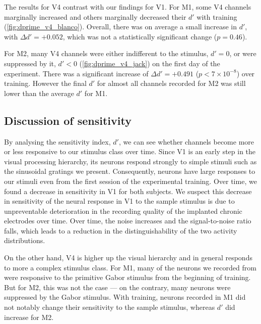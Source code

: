 The results for \ac{V4} contrast with our findings for \ac{V1}.
For \ac{M1}, some \ac{V4} channels marginally increased and others marginally decreased their $d'$ with training (\autoref{fig:dprime_v4_blanco}).
Overall, there was on average a small increase in $d'$, with $\Delta d' = +0.052$, which was not a statistically significant change ($p=0.46$).

For \ac{M2}, many \ac{V4} channels were either indifferent to the stimulus, $d'=0$, or were suppressed by it, $d'<0$ (\autoref{fig:dprime_v4_jack}) on the first day of the experiment.
There was a significant increase of $\Delta d' = +0.491$ ($p < 7 \times 10 ^{-8}$) over training.
However the final $d'$ for almost all channels recorded for \ac{M2} was still lower than the average $d'$ for \ac{M1}.


\subsection{Discussion of sensitivity}
\label{sec:pl_dprime_discuss}

By analysing the sensitivity index, $d'$, we can see whether channels become more or less responsive to our stimulus class over time.
Since \ac{V1} is an early step in the visual processing hierarchy, its neurons respond strongly to simple stimuli such as the sinusoidal gratings we present.
Consequently, neurons have large responses to our stimuli even from the first session of the experimental training.
Over time, we found a decrease in sensitivity in \ac{V1} for both subjects.
We suspect this decrease in sensitivity of the neural response in \ac{V1} to the sample stimulus is due to unpreventable deterioration in the recording quality of the implanted chronic electrodes over time.
Over time, the noise increases and the signal-to-noise ratio falls, which leads to a reduction in the distinguishability of the two activity distributions.

On the other hand, \ac{V4} is higher up the visual hierarchy and in general responds to more a complex stimulus class.
For \ac{M1}, many of the neurons we recorded from were responsive to the primitive Gabor stimulus from the beginning of training.
But for \ac{M2}, this was not the case --- on the contrary, many neurons were suppressed by the Gabor stimulus.
With training, neurons recorded in \ac{M1} did not notably change their sensitivity to the sample stimulus, whereas $d'$ did increase for \ac{M2}.

